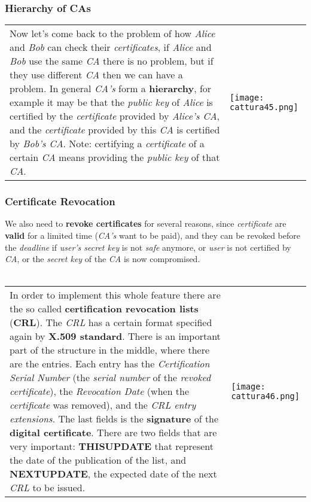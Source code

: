 \documentclass{article}
\begin{document}
\subsubsection{Hierarchy of CAs}
\begin{tabular}{C{10cm}  L{10.5cm}}
Now let’s come back to the problem of how \emph{Alice} and \emph{Bob} can check their \emph{certificates}, if \emph{Alice} and \emph{Bob} use the same \emph{CA} there is no problem, but if they use different \emph{CA} then we can have a problem. In general \emph{CA’s} form a \textbf{hierarchy}, for example it may be that the \emph{public key} of \emph{Alice} is certified by the \emph{certificate} provided by \emph{Alice’s CA}, and the \emph{certificate} provided by this \emph{CA} is certified by \emph{Bob’s CA}. Note: certifying a \emph{certificate} of a certain \emph{CA} means providing the \emph{public key} of that \emph{CA}. 
& \texttt{[image: cattura45.png]} 
\end{tabular}
\subsubsection{Certificate Revocation}
We also need to \textbf{revoke certificates} for several reasons, since \emph{certificate} are \textbf{valid} for a limited time (\emph{CA's} want to be paid), and they can be revoked before the \emph{deadline} if \emph{user's secret key} is not \emph{safe} anymore, or \emph{user} is not certified by \emph{CA}, or the \emph{secret key} of the \emph{CA} is now compromised.\\\\
\begin{tabular}{C{10cm}  L{10.5cm}}
In order to implement this whole feature there are the so called \textbf{certification revocation lists} (\textbf{CRL}). 
The \emph{CRL} has a certain format specified again by \textbf{X.509 standard}. There is an important part of the structure in the middle, where there are the entries. Each entry has the \emph{Certification Serial Number} (the \emph{serial number} of the \emph{revoked certificate}), the \emph{Revocation Date} (when the \emph{certificate} was removed), and the \emph{CRL entry extensions}. The last fields is the \textbf{signature} of the \textbf{digital certificate}. There are two fields that are very important: \textbf{THISUPDATE} that represent the date of the publication of the list, and \textbf{NEXTUPDATE}, the expected date of the next \emph{CRL} to be issued.
& \texttt{[image: cattura46.png]} 
\end{tabular}
\end{document}
